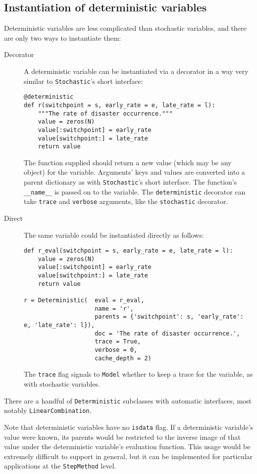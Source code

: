 \subsection{Instantiation of deterministic variables}
Deterministic variables are less complicated than stochastic variables, and there are only two ways to instantiate them:
\begin{description}
    \item[Decorator] A deterministic variable can be instantiated via a decorator in a way very similar to \texttt{Stochastic}'s short interface:
\begin{verbatim}
@deterministic
def r(switchpoint = s, early_rate = e, late_rate = l):
    """The rate of disaster occurrence."""
    value = zeros(N)
    value[:switchpoint] = early_rate
    value[switchpoint:] = late_rate
    return value
\end{verbatim}
The function supplied should return a new value (which may be any object) for the variable. Arguments' keys and values are converted into a parent dictionary as with \texttt{Stochastic}'s short interface. The function's \texttt{__name__} is passed on to the variable. The \texttt{deterministic} decorator can take \texttt{trace} and \texttt{verbose} arguments, like the \texttt{stochastic} decorator.
    \item[Direct] The same variable could be instantiated directly as follows:
\begin{verbatim}
def r_eval(switchpoint = s, early_rate = e, late_rate = l):
    value = zeros(N)
    value[:switchpoint] = early_rate
    value[switchpoint:] = late_rate
    return value

r = Deterministic(  eval = r_eval, 
                    name = 'r',
                    parents = {'switchpoint': s, 'early_rate': e, 'late_rate': l}),
                    doc = 'The rate of disaster occurrence.',
                    trace = True,
                    verbose = 0,
                    cache_depth = 2)
\end{verbatim}
The \texttt{trace} flag signals to \texttt{Model} whether to keep a trace for the variable, as with stochastic variables.
\end{description}

There are a handful of \texttt{Deterministic} subclasses with automatic interfaces, most notably \texttt{LinearCombination}.

Note that deterministic variables have no \texttt{isdata} flag. If a deterministic variable's value were known, its parents would be restricted to the inverse image of that value under the deterministic variable's evaluation function. This usage would be extremely difficult to support in general, but it can be implemented for particular applications at the \texttt{StepMethod} level.


